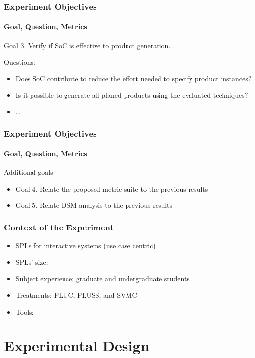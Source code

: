 \documentclass{beamer}
\begin{document}
\begin{frame}
\frametitle{Experiment Objectives}
\framesubtitle{Goal, Question, Metrics}

\begin{block}{Goal 3. Verify if SoC is effective to product generation.} 

Questions:
\small{
\begin{itemize}
  \item Does SoC contribute to reduce the effort needed to specify product
  instances?
  \item Is it possible to generate all planed products using the evaluated techniques?
  \item \ldots
\end{itemize}
}
\end{block}

\end{frame}

\begin{frame}
\frametitle{Experiment Objectives}
\framesubtitle{Goal, Question, Metrics}

\begin{block}{Additional goals}
\begin{itemize}
\item Goal 4. Relate the proposed metric suite to the previous results
\item Goal 5. Relate DSM analysis to the previous results
\end{itemize}
\end{block}

\end{frame}

 
\begin{frame}
\frametitle{Context of the Experiment}

\begin{itemize}
  \item SPLs for interactive systems (use case centric)
  \item SPLs' size: ---
  \item Subject experience: graduate and undergraduate students
  \item Treatments: PLUC, PLUSS, and SVMC
  \item Tools: ---    
\end{itemize}

\end{frame}

\section{Experimental Design}
\end{document}
